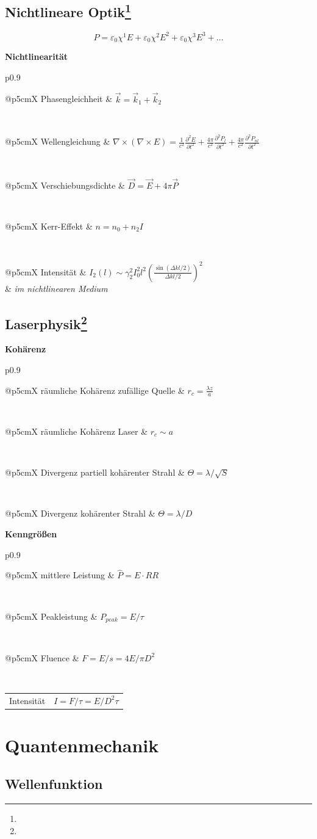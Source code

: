 \documentclass[12pt,a4paper, twoside]{article}
\makeatletter
\newcommand{\pdd}[2]{\frac{\partial^2 #1}{\partial #2^2}}
\renewcommand{\=}[1]{\stackrel{#1}{=}}
\theoremstyle{definition}
\theoremstyle{remark}
\newcommand{\concept}[2]{%
\noindent
\begin{framed}
\noindent\textbf{#1}
\par\begin{tabular}{p{0.9\linewidth}}
#2
\end{tabular}
\end{framed}
}
\newcommand{\fnote}[3]{%
\noindent\begin{tabularx}{\linewidth}{@{}p{5cm}X}
#1 & $#2$\\
& \textit{\small{#3}}
\end{tabularx}}
\newcommand{\f}[2]{%
\noindent\begin{tabularx}{\linewidth}{@{}p{5cm}X}
#1 & $#2$
\end{tabularx}}
\makeatother
\begin{document}
\subsection[Nichtlineare Optik]{Nichtlineare Optik\let\thefootnote\relax\footnote{}}

\begin{center}
\begin{framed}
$$P = \varepsilon_0 \chi^1 E + \varepsilon_0 \chi^2 E^2 + \varepsilon_0 \chi^3 E^3 + ...$$
\end{framed}
\end{center}

\concept{Nichtlinearität}{
\f{Phasengleichheit}{\vec k = \vec k_1 + \vec k_2}\\
\f{Wellengleichung}{\nabla \times (\nabla \times E) = \frac{1}{c^2} \pdd{E}{t} + \frac{4\pi}{c^2} \pdd{P_l}{t} + \frac{4\pi}{c^2} \pdd{P_{nl}}{t}}\\
\f{Verschiebungsdichte}{\vec D = \vec E + 4 \pi \vec P}\\
\f{Kerr-Effekt}{n = n_0 + n_2 I}\\
\fnote{Intensität}{I_2(l) \sim \gamma_2^2 I_0^2 l^2 (\frac{\sin(\Delta k l/2)}{\Delta k l / 2})^2}{im nichtlinearen Medium}
}

\subsection[Laserphysik]{Laserphysik\let\thefootnote\relax\footnote{}}

\concept{Kohärenz}{
\f{räumliche Kohärenz zufällige Quelle}{r_c = \frac{\lambda z}{a}}\\
\f{räumliche Kohärenz Laser}{r_c \sim a}\\
\f{Divergenz partiell kohärenter Strahl}{\Theta = \lambda / \sqrt{S}}\\
\f{Divergenz kohärenter Strahl}{\Theta = \lambda / D}
}


\concept{Kenngrößen}{
\f{mittlere Leistung}{\hat P = E \cdot RR}\\
\f{Peakleistung}{P_{peak} = E/\tau}\\
\f{Fluence}{F = E/s = 4E/\pi D^2}\\
\f{Intensität}{I = F/\tau = E/D^2 \tau}
}


\newpage
\section{Quantenmechanik}

\subsection{Wellenfunktion}
\end{document}
